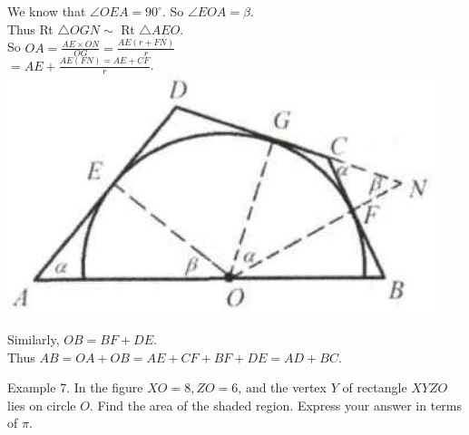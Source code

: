 \documentclass[10pt]{article}
\begin{document}
We know that \(\angle O E A=90^{\circ}\). So \(\angle E O A=\beta\).\\
Thus Rt \(\triangle O G N \sim\) Rt \(\triangle A E O\).\\
So \(O A=\frac{A E \times O N}{O G}=\frac{A E(r+F N)}{r}\)\\
\(=A E+\frac{A E(F N)=A E+C F}{r}\).\\
\includegraphics[max width=\textwidth, center]{2025_04_17_97bc1f7e44d93c271a88g-149(1)}

Similarly, \(O B=B F+D E\).\\
Thus \(A B=O A+O B=A E+C F+B F+D E=A D+B C\).


Example 7. In the figure \(X O=8, Z O=6\), and the vertex \(Y\) of rectangle \(X Y Z O\) lies on circle \(O\). Find the area of the shaded region. Express your answer in terms of \(\pi\).
\end{document}
